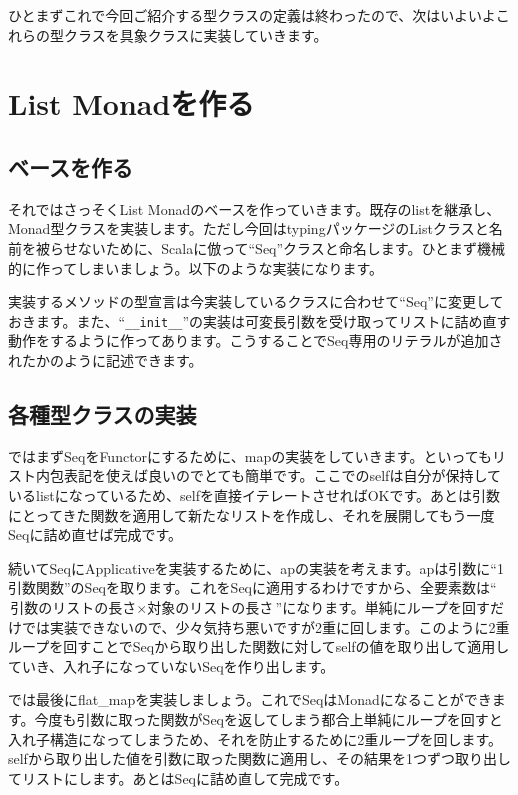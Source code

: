ひとまずこれで今回ご紹介する型クラスの定義は終わったので、次はいよいよこれらの型クラスを具象クラスに実装していきます。

\section{List Monadを作る}
\subsection{ベースを作る}
それではさっそくList Monadのベースを作っていきます。既存のlistを継承し、Monad型クラスを実装します。ただし今回はtypingパッケージのListクラスと名前を被らせないために、Scalaに倣って``Seq''クラスと命名します。ひとまず機械的に作ってしまいましょう。以下のような実装になります。


実装するメソッドの型宣言は今実装しているクラスに合わせて``Seq''に変更しておきます。また、``\verb+__init__+''の実装は可変長引数を受け取ってリストに詰め直す動作をするように作ってあります。こうすることでSeq専用のリテラルが追加されたかのように記述できます。

\subsection{各種型クラスの実装}
ではまずSeqをFunctorにするために、mapの実装をしていきます。といってもリスト内包表記を使えば良いのでとても簡単です。ここでのselfは自分が保持しているlistになっているため、selfを直接イテレートさせればOKです。あとは引数にとってきた関数を適用して新たなリストを作成し、それを展開してもう一度Seqに詰め直せば完成です。


続いてSeqにApplicativeを実装するために、apの実装を考えます。apは引数に``1引数関数''のSeqを取ります。これをSeqに適用するわけですから、全要素数は``$\mbox{引数のリストの長さ} \times \mbox{対象のリストの長さ}$''になります。単純にループを回すだけでは実装できないので、少々気持ち悪いですが2重に回します。このように2重ループを回すことでSeqから取り出した関数に対してselfの値を取り出して適用していき、入れ子になっていないSeqを作り出します。


では最後にflat\_mapを実装しましょう。これでSeqはMonadになることができます。今度も引数に取った関数がSeqを返してしまう都合上単純にループを回すと入れ子構造になってしまうため、それを防止するために2重ループを回します。selfから取り出した値を引数に取った関数に適用し、その結果を1つずつ取り出してリストにします。あとはSeqに詰め直して完成です。


